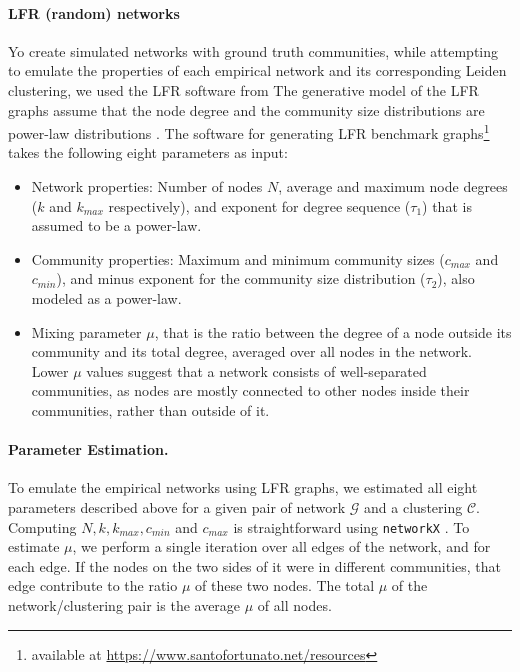 \documentclass[11pt]{article}   	%
\begin{document}
\paragraph{LFR (random) networks}

Yo create simulated networks with ground truth communities, while attempting to emulate the properties of each empirical network and its corresponding Leiden clustering, we used the LFR software from \cite{lancichinetti2008benchmark}  The generative model of the LFR graphs assume that the node degree and the community size distributions are power-law distributions  \citep{albert2002statistical}.
The software for generating LFR benchmark graphs\footnote{available at \href{https://www.santofortunato.net/resources}{https://www.santofortunato.net/resources}} takes the following eight parameters as input:
\begin{itemize}
    \item  Network properties: Number of nodes $N$, average and maximum node degrees ($k$ and $k_{max}$ respectively), and exponent for degree sequence ($\tau_1$) that is assumed to be a power-law.
    \item Community properties: Maximum and minimum community sizes ($c_{max}$ and $c_{min}$), and minus exponent for the community size distribution ($\tau_2$), also modeled as a power-law.
    \item Mixing parameter $\mu$, that is the ratio between the degree of a node outside its community and its total degree, averaged over all nodes in the network. Lower $\mu$ values suggest that a network consists of well-separated communities, as nodes are mostly connected to other nodes inside their communities, rather than outside of it.
\end{itemize}






\paragraph{Parameter Estimation.} To emulate the empirical networks using LFR graphs, we estimated all eight parameters described above for a given pair of network $\mathcal{G}$ and a clustering $\mathcal{C}$. Computing $N, k, k_{max}, c_{min}$ and $c_{max}$ is straightforward using \texttt{networkX} \citep{hagberg2008exploring}. To estimate $\mu$, we perform a single iteration over all edges of the network, and for each edge. If the nodes on the two sides of it were in different communities, that edge contribute to the ratio $\mu$ of these two nodes. The total $\mu$ of the network/clustering pair is the average $\mu$ of all nodes.
\end{document}
